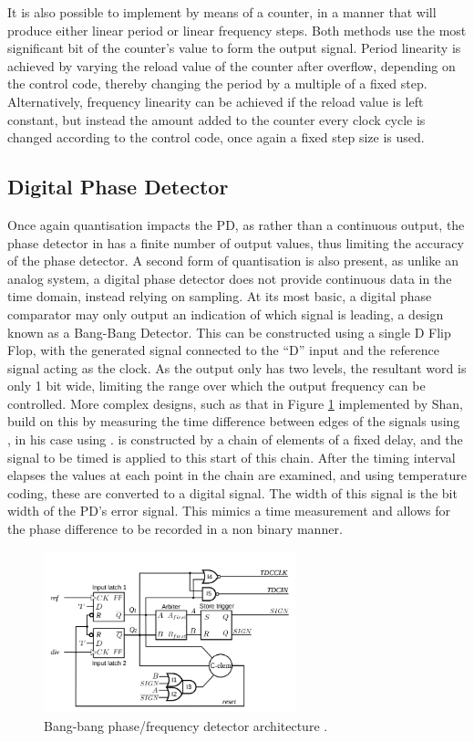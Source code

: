 It is also possible to implement  by means of a counter, in a manner that will produce either linear period or linear frequency steps. Both methods use the most significant bit of the counter's value to form the output signal. Period linearity is achieved by varying the reload value of the counter after overflow, depending on the control code, thereby changing the period by a multiple of a fixed step. Alternatively, frequency linearity can be achieved if the reload value is left constant, but instead the amount added to the counter every clock cycle is changed according to the control code, once again a fixed step size is used.

\subsection{Digital Phase Detector}
Once again quantisation impacts the \acl{PD}, as rather than a continuous output, the phase detector in  has a finite number of output values, thus limiting the accuracy of the phase detector. A second form of quantisation is also present, as unlike an analog system, a digital phase detector does not provide continuous data in the time domain, instead relying on sampling. At its most basic, a digital phase comparator may only output an indication of which signal is leading, a design known as a Bang-Bang Detector. This can be constructed using a single D Flip Flop, with the generated signal connected to the ``D'' input and the reference signal acting as the clock. As the output only has two levels, the resultant word is only 1 bit wide, limiting the range over which the output frequency can be controlled. More complex designs, such as that in Figure \ref{fig:shan_bb_pd} implemented by Shan, build on this by measuring the time difference between edges of the signals using , in his case using  \cite{shan2014phd}.  is constructed by a chain of elements of a fixed delay, and the signal to be timed is applied to this start of this chain. After the timing interval elapses the values at each point in the chain are examined, and using temperature coding, these are converted to a digital signal. The width of this signal is the bit width of the \ac{PD}'s error signal. This mimics a time measurement and allows for the phase difference to be recorded in a non binary manner.

\begin{figure}[h]
	\centering
	\includegraphics[width=0.65\textwidth]{../shan_bb_pd}
	\caption[Bang-bang phase/frequency detector architecture]{Bang-bang phase/frequency detector architecture \cite{shan2014phd}.}
	\label{fig:shan_bb_pd}
\end{figure}


